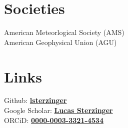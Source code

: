 \documentclass[]{deedy-resume-reversed}
\begin{document}
\begin{minipage}[t]{0.33\textwidth}




\section{Societies}
American Meteorlogical Society (AMS)\\
American Geophysical Union (AGU)
\sectionsep


\section{Links}
Github: \href{https://github.com/lsterzinger}{\bf lsterzinger} \\
Google Scholar: \href{https://scholar.google.com/citations?user=W5M2bZkAAAAJ&hl=en&oi=ao}{\bf Lucas Sterzinger} \\
ORCiD: \href{https://orcid.org/0000-0003-3321-4534}{\bf 0000-0003-3321-4534}
\sectionsep

\end{minipage}
\end{document}
